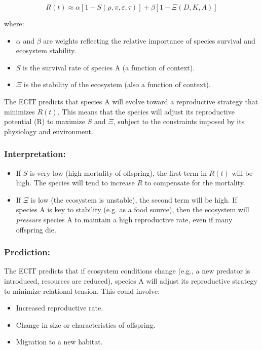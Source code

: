 \documentclass{article}
\begin{document}
$$ R(t) \approx \alpha [1 - S(\rho, \pi, \varepsilon, \tau)] + \beta [1 - \Xi(D, K, A)] $$

where:

\begin{itemize}
    \item \(\alpha\) and \(\beta\) are weights reflecting the relative importance of species survival and ecosystem stability.
    \item \(S\) is the survival rate of species A (a function of context).
    \item \(\Xi\) is the stability of the ecosystem (also a function of context).
\end{itemize}
The ECIT predicts that species A will evolve toward a reproductive strategy that minimizes \(R(t)\). This means that the species will adjust its reproductive potential (R) to maximize \(S\) and \(\Xi\), subject to the constraints imposed by its physiology and environment.

\subsubsection{Interpretation:}

\begin{itemize}
\item If \(S\) is very low (high mortality of offspring), the first term in \(R(t)\) will be high. The species will tend to increase \(R\) to compensate for the mortality.
\item If \(\Xi\) is low (the ecosystem is unstable), the second term will be high. If species A is key to stability (e.g. as a food source), then the ecosystem will \textit{pressure} species A to maintain a high reproductive rate, even if many offspring die.
\end{itemize}

\subsubsection{Prediction:}
The ECIT predicts that if ecosystem conditions change (e.g., a new predator is introduced, resources are reduced), species A will adjust its reproductive strategy to minimize relational tension. This could involve:

\begin{itemize}
\item Increased reproductive rate.
\item Change in size or characteristics of offspring.
\item Migration to a new habitat.
\end{itemize}
\end{document}
